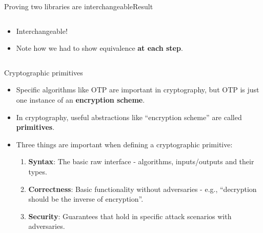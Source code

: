\documentclass[aspectratio=169, lualatex, handout]{beamer}
\begin{document}
\begin{frame}{Proving two libraries are interchangeable}{Result}
	\begin{columns}[c]
		\begin{column}{0.5\textwidth}
			\begin{itemize}
				\item Interchangeable!
				\item Note how we had to show equivalence \textbf{at each step}.
			\end{itemize}
		\end{column}
		\begin{column}{0.5\textwidth}
			\begin{center}
			\end{center}
		\end{column}
	\end{columns}
\end{frame}

\begin{frame}{Cryptographic primitives}
	\begin{itemize}
		\item Specific algorithms like OTP are important in cryptography, but OTP is just one instance of an \textbf{encryption scheme}.
		\item In cryptography, useful abstractions like ``encryption scheme'' are called \textbf{primitives}.
		\item Three things are important when defining a cryptographic primitive:
		      \begin{enumerate}
			      \item \textbf{Syntax}: The basic raw interface - algorithms, inputs/outputs and their types.
			      \item \textbf{Correctness}: Basic functionality without adversaries - e.g., ``decryption should be the inverse of encryption''.
			      \item \textbf{Security}: Guarantees that hold in specific attack scenarios with adversaries.
		      \end{enumerate}
	\end{itemize}
\end{frame}
\end{document}
